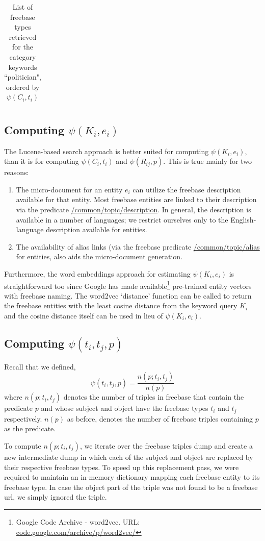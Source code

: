 \documentclass[a4paper, twoside, 12pt]{report}
\begin{document}
\begin{longtable}{| p{} | p{} |}
\caption{List of freebase types retrieved for the category keywords ``politician", ordered by $\psi(C_i,t_i)$}
\label{tab:politician}
\end{longtable}

\subsection{Computing $\psi(K_i, e_i)$}
The Lucene-based search approach is better suited for computing $\psi(K_i, e_i)$, than it is for computing $\psi(C_i, t_i)$ and $\psi(R_{ij}, p)$. This is true mainly for two reasons:
\begin{enumerate}
\item The micro-document for an entity $e_i$ can utilize the freebase description available for that entity. Most freebase entities are linked to their description via the predicate \url{/common/topic/description}. In general, the description is available in a number of languages; we restrict ourselves only to the English-language description available for entities.
\item The availability of alias links (via the freebase predicate \url{/common/topic/alias} for entities, also aids the micro-document generation.
\end{enumerate}

Furthermore, the word embeddings approach for estimating $\psi(K_i,e_i)$ is straightforward too since Google has made available\footnote{Google Code Archive - word2vec. URL: \url{code.google.com/archive/p/word2vec/}} pre-trained entity vectors with freebase naming. The word2vec `distance' function can be called to return the freebase entities with the least cosine distance from the keyword query $K_i$ and the cosine distance itself can be used in lieu of $\psi(K_i,e_i)$.

\subsection{Computing $\psi(t_i, t_j, p)$}
Recall that we defined, $$\psi(t_i, t_j, p) = \frac{n(p;t_i,t_j)}{n(p)}$$ where $n(p;t_i,t_j)$ denotes the number of triples in freebase that contain the predicate $p$ and whose subject and object have the freebase types $t_i$ and $t_j$ respectively. $n(p)$ as before, denotes the number of freebase triples containing $p$ as the predicate.

To compute $n(p;t_i,t_j)$, we iterate over the freebase triples dump and create a new intermediate dump in which each of the subject and object are replaced by their respective freebase types. To speed up this replacement pass, we were required to maintain an in-memory dictionary mapping each freebase entity to its freebase type. In case the object part of the triple was not found to be a freebase url, we simply ignored the triple.
\end{document}

